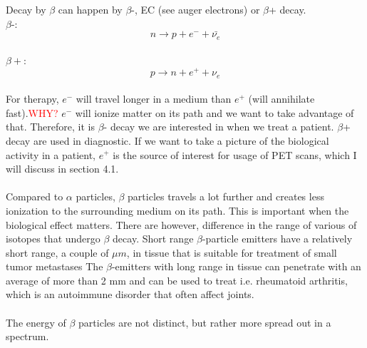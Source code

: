 \documentclass[twoside,english]{uiofysmaster/uiofysmaster}
\begin{document}
Decay by $\beta$ can happen by $\beta$-, EC (see auger electrons) or $\beta$+ decay.\\
$\beta$-:
\begin{equation}
n \rightarrow p + e^- + \bar{\nu_e} 
\end{equation}\\
$\beta+$:
\begin{equation}
p \rightarrow n + e^+ + \nu_e
\end{equation}\\
For therapy, $e^-$ will travel longer in a medium than $e^+$ (will annihilate fast).\textcolor{red}{WHY?} $e^-$ will ionize matter on its path and we want to take advantage of that. Therefore, it is $\beta$- decay we are interested in when we treat a patient. $\beta$+ decay are used in diagnostic. If we want to take a picture of the biological activity in a patient, $e^+$ is the source of interest for usage of PET scans, which I will discuss in section 4.1.\\
\\
Compared to $\alpha$ particles, $\beta$ particles travels a lot further and creates less ionization to the surrounding medium on its path. This is important when the biological effect matters. There are however, difference in the range of various of isotopes that undergo $\beta$ decay. Short range $\beta$-particle emitters have a relatively short range, a couple of $\mu m$, in tissue that is suitable for treatment of small tumor metastases%
The $\beta$-emitters with long range in tissue can penetrate with an average of more than 2 mm and can be used to treat i.e. rheumatoid arthritis, which is an autoimmune disorder that often affect joints.\\
\\
The energy of $\beta$ particles are not distinct, but rather more spread out in a spectrum.

\end{document}
